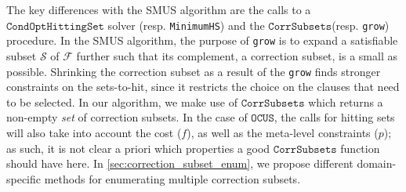 \documentclass[a4paper,UKenglish,cleveref, autoref, thm-restate, pdfa]{lipics-v2021}
\newcommand\m[1]{\mathcal{#1}}
\renewcommand\comment[1]{}
\newcommand{\emilio}[1]{{\comment{\color{red}Emilio: #1}}}
\newcommand{\bart}[1]{{\comment{\color{OliveGreen}Bart: #1}}}
\newcommand\formula{\ensuremath{\m{F} }\xspace}
\newcommand\mm[1]{\ensuremath{#1}\xspace}
\newcommand\call[1]{\mm{\texttt{#1}}}
\newcommand\cohs{\mm{\call{CondOptHittingSet}}}
\newcommand\grow{\mm{\call{Grow}}}
\newcommand\comus{\mm{\call{OCUS}}}
\newcommand\corrsubsets{\mm{\call{CorrSubsets}}}
\begin{document}
The key differences with the SMUS algorithm are the calls to a \cohs solver (resp. \texttt{MinimumHS}) and the \corrsubsets (resp. \texttt{grow}) procedure.
In the SMUS algorithm, the purpose of \texttt{grow} is to expand a satisfiable subset $\m{S}$ of $\m{F}$ further such that its complement, a correction subset, is a small as possible.
Shrinking the correction subset as a result of the \texttt{grow} finds stronger constraints on the sets-to-hit, since it restricts the choice on the clauses that need to be selected. 
In our algorithm, we make use of \corrsubsets which returns a non-empty \emph{set} of correction subsets. 
In the case of \comus, the calls for hitting sets will also take into account the cost ($f$), as well as the meta-level constraints ($p$); as such, it is not clear a priori which properties a good \corrsubsets function should have here.
In \cref{sec:correction_subset_enum}, we propose different domain-specific methods for enumerating multiple correction subsets. 
\end{document}
